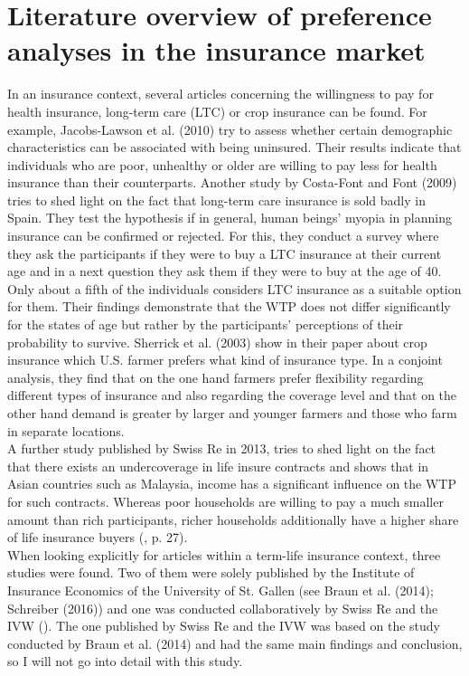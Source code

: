\documentclass[12pt, abstracton]{article}
\begin{document}
\section{Literature overview of preference analyses in the insurance market}
In an insurance context, several articles concerning the willingness to pay for health insurance, long-term care (LTC) or crop insurance can be found. For example, Jacobs-Lawson et al. (2010) try to assess whether certain demographic characteristics can be associated with being uninsured. Their results indicate that individuals who are poor, unhealthy or older are willing to pay less for health insurance than their counterparts. Another study by Costa-Font and Font (2009) tries to shed light on the fact that long-term care insurance is sold badly in Spain. They test the hypothesis if in general, human beings’ myopia in planning insurance can be confirmed or rejected. For this, they conduct a survey where they ask the participants if they were to buy a LTC insurance at their current age and in a next question they ask them if they were to buy at the age of 40. Only about a fifth of the individuals considers LTC insurance as a suitable option for them. Their findings demonstrate that the WTP does not differ significantly for the states of age but rather by the participants’ perceptions of their probability to survive. Sherrick et al. (2003) show in their paper about crop insurance which U.S. farmer prefers what kind of insurance type. In a conjoint analysis, they find that on the one hand farmers prefer flexibility regarding different types of insurance and also regarding the coverage level and that on the other hand demand is greater by larger and younger farmers and those who farm in separate locations.\\
A further study published by Swiss Re in 2013, tries to shed light on the fact that there exists an undercoverage in life insure contracts and shows that in Asian countries such as Malaysia, income has a significant influence on the WTP for such contracts. Whereas poor households are willing to pay a much smaller amount than rich participants, richer households additionally have a higher share of life insurance buyers (\cite{Kirova2013}, p. 27).\\
When looking explicitly for articles within a term-life insurance context, three studies were found. Two of them were solely published by the Institute of Insurance Economics of the University of St. Gallen (see Braun et al. (2014); Schreiber (2016)) and one was conducted collaboratively by Swiss Re and the IVW (\cite{Braun2014}). The one published by Swiss Re and the IVW was based on the study conducted by Braun et al. (2014) and had the same main findings and conclusion, so I will not go into detail with this study.\\
\end{document}
